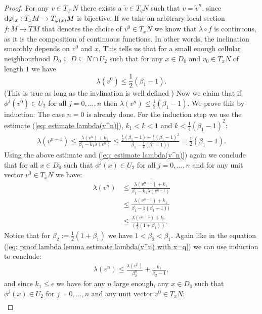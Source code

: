 \begin{proof}
		
		For any $v\in T_{q^n}N$ there exists a $\tilde{v} \in T_qN$ such that $v=\tilde{v}^n$, since
		$\mathop{}\!\mathrm{d} \varphi|_x:T_xM \to T_{\varphi(x)}M$ is bijective. 
		If we take an arbitrary local section $f:M \to TM$
		that denotes the choice of $v^0\in T_xN$ we know that $\lambda \circ f$ is continuous, 
		as it is the composition of continuous functions. In other words, the inclination smoothly depends on $v^0$ and $x$. 
		This tells us that for a small enough cellular neighbourhood $D_0 \subseteq D\subseteq N \cap U_2$ such that for any $x\in D_0$ and $v_0\in T_xN$ of length $1$ we have
		\begin{equation}
			\lambda(v^0)\leq \frac{1}{2} (\beta_1-1).
		\end{equation} (This is true as long as the invlination is well defined )
		Now we claim that if $\phi^j(v^0)\in U_2$ for all $j=0,...,n$ then $\lambda(v^n)\leq \frac{1}{2}(\beta_1-1).$ We prove this by induction: The case $n=0$ is already done. For the induction step we use the estimate (\ref{eq: estimate lambda(v^n)}), $k_1 <k<1$ and $k< \frac{1}{4}(\beta_1-1)^2$:
		\begin{align*}
			\lambda(v^{n+1})\leq \frac{\lambda(v^{n})+k_1}{ \beta_1  - k_1 \lambda(v^{n})}\leq \frac{ \frac{1}{2}(\beta_1-1)+\frac{1}{4}(\beta_1-1)^2}{ \beta_1  - \frac{1}{2}(\beta_1-1))} = \frac{1}{2}(\beta_1-1).
		\end{align*} Using the above estimate and (\ref{eq: estimate lambda(v^n)}) again we conclude that for all $x\in D_0$ such that $\phi^j(x)\in U_2$ for all $j=0,...,n$ and for any unit vector $v^0\in T_xN$ we have:
		\begin{align*}
			\lambda(v^{n})& \leq \frac{\lambda(v^{n-1})+k_1}{ \beta_1  - k_1 \lambda(v^{n-1})}\\
			&\leq \frac{\lambda(v^{n-1})+k_1}{ \beta_1  - \frac{1}{2}(\beta_1-1))}\\
			&\leq \frac{\lambda(v^{n-1})+k_1}{ (\frac{1}{2}(1+\beta_1))}.
		\end{align*} Notice that for $\beta_2:=\frac{1}{2}(1+\beta_1)$ we have $1<\beta_2<\beta_1$. Again like in the equation (\ref{eq: proof lambda lemma estimate lambda(v^n) with x=q}) we can use induction to conclude:
		\begin{align*}
			\lambda(v^n)\leq \frac{\lambda(v^0)}{\beta_2^n}+\frac{k_1}{\beta_2-1},
		\end{align*} and since $k_1\leq \epsilon$ we have for any $n$ large enough, any $x\in D_0$ such that $\phi^j(x) \in U_2$ for $j=0,...,n$ and any unit vector $v^0 \in T_xN$:
		\begin{align*}

\end{align*}
\end{proof}
